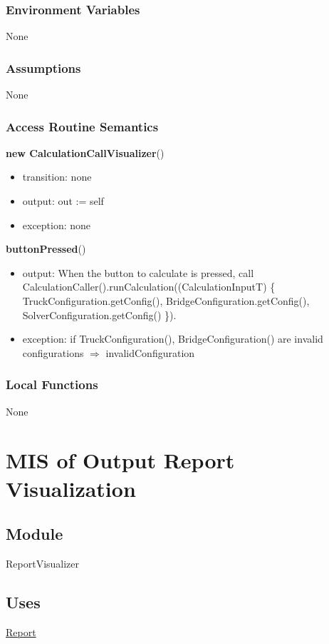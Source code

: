 \documentclass[12pt, titlepage]{article}
\begin{document}
\subsubsection{Environment Variables}
None
\subsubsection{Assumptions}
None
\subsubsection{Access Routine Semantics}

\noindent \textbf{new CalculationCallVisualizer}()
\begin{itemize}
\item transition: none
\item output: out := self
\item exception: none
\end{itemize}

\noindent \textbf{buttonPressed}()
\begin{itemize}
\item output: When the button to calculate is pressed, call\\
CalculationCaller().runCalculation((CalculationInputT) \{ TruckConfiguration.getConfig(), BridgeConfiguration.getConfig(), SolverConfiguration.getConfig() \}).
\item exception: if TruckConfiguration(), BridgeConfiguration() are invalid configurations $\Rightarrow$ invalidConfiguration
\end{itemize}
\subsubsection{Local Functions}
None

\newpage
\section{MIS of Output Report Visualization} \label{ReportVisualizer}

\subsection{Module}

ReportVisualizer

\subsection{Uses}
\hyperref[Report]{Report}
\end{document}
